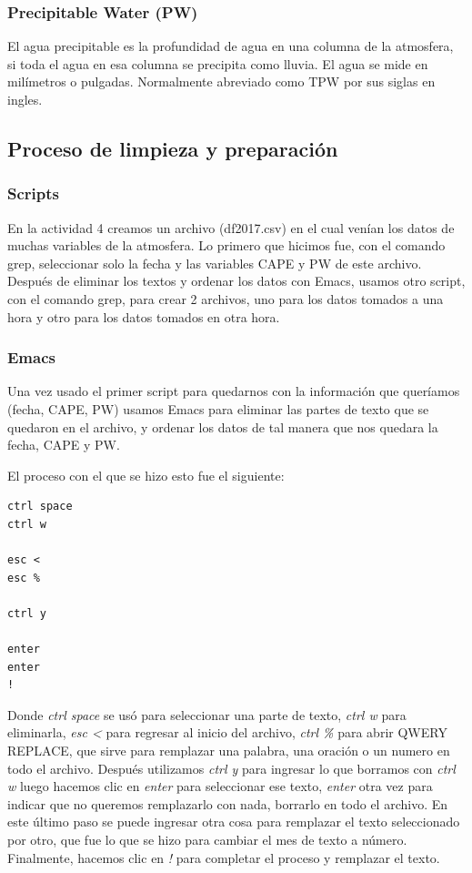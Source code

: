 \documentclass{article}
\begin{document}
\subsubsection{Precipitable Water (PW)}

El agua precipitable es la profundidad de agua en una columna de la atmosfera, si toda el agua en esa columna se precipita como lluvia. El agua se mide en milímetros o pulgadas. Normalmente abreviado como TPW por sus siglas en ingles.

\subsection{Proceso de limpieza y preparación}

\subsubsection{Scripts}

En la actividad 4 creamos un archivo (df2017.csv) en el cual venían los datos de muchas variables de la atmosfera. Lo primero que hicimos fue, con el comando grep, seleccionar solo la fecha y las variables CAPE y PW de este archivo. Después de eliminar los textos y ordenar los datos con Emacs, usamos otro script, con el comando grep, para crear 2 archivos, uno para los datos tomados a una hora y otro para los datos tomados en otra hora.

\subsubsection{Emacs}

Una vez usado el primer script para quedarnos con la información que queríamos (fecha, CAPE, PW) usamos Emacs para eliminar las partes de texto que se quedaron en el archivo, y ordenar los datos de tal manera que nos quedara la fecha, CAPE y PW.

El proceso con el que se hizo esto fue el siguiente:

\begin{verbatim}
ctrl space
ctrl w

esc <
esc %

ctrl y

enter
enter
!
\end{verbatim}

Donde \textit{ctrl space} se usó para seleccionar una parte de texto, \textit{ctrl w} para eliminarla, \textit{esc <} para regresar al inicio del archivo, \textit{ctrl \%} para abrir QWERY REPLACE, que sirve para remplazar una palabra, una oración o un numero en todo el archivo. Después utilizamos \textit{ctrl y} para ingresar lo que borramos con \textit{ctrl w} luego hacemos clic en \textit{enter} para seleccionar ese texto, \textit{enter} otra vez para indicar que no queremos remplazarlo con nada, borrarlo en todo el archivo. En este último paso se puede ingresar otra cosa para remplazar el texto seleccionado por otro, que fue lo que se hizo para cambiar el mes de texto a número. Finalmente, hacemos clic en \textit{!} para completar el proceso y remplazar el texto.
\end{document}
